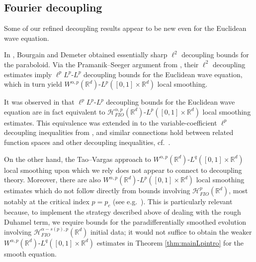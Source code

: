 \documentclass{amsart}
\numberwithin{equation}{section}
\theoremstyle{definition}
\newcommand{\R}{\mathbb{R}}
\newcommand{\Rd}{\mathbb{R}^{d}}
\newcommand {\HT}{\mathcal{H}}
\newcommand {\Hp}{\mathcal{H}^{p}_{FIO}(\R^d)}
\begin{document}
\subsection{Fourier decoupling}

Some of our refined decoupling results appear to be new even for 
the Euclidean wave equation.

In \cite{BourgainDemeter2015}, Bourgain and Demeter obtained essentially sharp 
$\ell^{2}$ decoupling bounds for the paraboloid.
Via the Pramanik--Seeger argument from \cite{Pramanik-Seeger07}, their $\ell^{2}$ decoupling estimates imply $\ell^{p}L^{p}$-$L^{p}$ decoupling bounds for the Euclidean wave equation, which in turn yield $W^{\alpha,p}(\Rd)$-$L^{p}([0,1]\times\Rd)$ local smoothing. 

It was observed in \cite{Rozendaal22b} that $\ell^{p}L^{p}$-$L^{p}$ decoupling bounds for the Euclidean wave equation are in fact equivalent to $\HT^{\alpha,p}_{FIO}(\Rd)$-$L^{p}([0,1]\times\Rd)$ local smoothing estimates. This equivalence was extended in \cite{LiRoSoYa24} to the variable-coefficient $\ell^{p}$ decoupling inequalities from \cite{BeltranHickmanSogge2020}, and similar connections hold between related function spaces and other decoupling inequalities, cf.~\cite{RozendaalSchippa2023,HaPoRoYu26,Schippa22}. 

On the other hand, the Tao--Vargas approach to $W^{\alpha,p}(\Rd)$-$L^{q}([0,1]\times\Rd)$ local smoothing upon which we rely does not appear to connect to decoupling theory. Moreover, there are also $W^{\alpha,p}(\Rd)$-$L^{p}([0,1]\times\Rd)$ local smoothing estimates which do not follow directly from bounds involving $\Hp$, most notably at the critical index $p=p_{c}$ (see e.g.~\cite[Section 5]{Rozendaal22b}). This is particularly relevant because, to implement the strategy described above of dealing with the rough Duhamel term, we require bounds for the paradifferentially smoothed evolution involving $\HT^{\alpha-s(p),p}_{FIO}(\Rd)$ initial data; it would not suffice to obtain the weaker $W^{\alpha,p}(\Rd)$-$L^{q}([0,1]\times\Rd)$ estimates in Theorem \ref{thm:mainLpintro} for the smooth equation.
\end{document}
